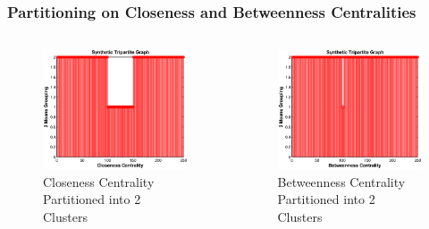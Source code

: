 \documentclass{beamer}
\begin{document}
\begin{frame}
\frametitle{Partitioning on Closeness and Betweenness Centralities}
\begin{columns}[T]
\begin{column}{.5\textwidth}
\begin{figure}[h]
\begin{center}
\includegraphics[width=0.76\columnwidth]{close_kmeans}
\end{center}
\caption{Closeness Centrality Partitioned into 2 Clusters}
\label{fig:closeness and k-means}
\end{figure}
\end{column}
\begin{column}{.5\textwidth}
\begin{figure}[h]
\begin{center}
\includegraphics[width=0.76\columnwidth]{betw_kmeans}
\end{center}
\caption{Betweenness Centrality Partitioned into 2 Clusters}
\label{fig:betweenness and k-means}
\end{figure}
\end{column}
\end{columns}
\end{frame}
\end{document}
